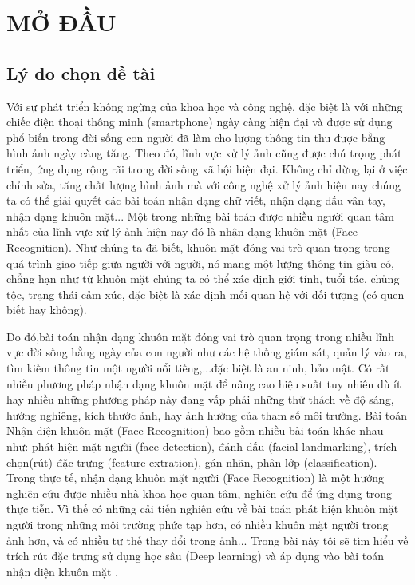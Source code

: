 

\chapter*{MỞ ĐẦU}
\label{part:dimred}

\section{Lý do chọn đề tài}

Với sự phát triển không ngừng của khoa học và công nghệ, đặc biệt là với những
chiếc điện thoại thông minh (smartphone) ngày càng hiện đại và được sử dụng
phổ biến trong đời sống con người đã làm cho lượng thông tin thu được bằng hình ảnh
ngày càng tăng. Theo đó, lĩnh vực xử lý ảnh cũng được chú trọng phát triển, ứng dụng
rộng rãi trong đời sống xã hội hiện đại. Không chỉ dừng lại ở việc chỉnh sửa, tăng
chất lượng hình ảnh mà với công nghệ xử lý ảnh hiện nay chúng ta có thể giải quyết
các bài toán nhận dạng chữ viết, nhận dạng dấu vân tay, nhận dạng khuôn mặt...
Một trong những bài toán được nhiều người quan tâm nhất của lĩnh vực xử lý ảnh hiện nay
đó là nhận dạng khuôn mặt (Face Recognition). Như chúng ta đã biết, khuôn mặt đóng
vai trò quan trọng trong quá trình giao tiếp giữa người với người, nó mang một lượng
thông tin giàu có, chẳng hạn như từ khuôn mặt chúng ta có thể xác định giới tính, tuổi tác,
chủng tộc, trạng thái cảm xúc, đặc biệt là xác định mối quan hệ với đối tượng (có quen biết
hay không).


Do đó,bài toán nhận dạng khuôn mặt đóng vai trò quan trọng trong nhiều lĩnh vực
đời sống hằng ngày của con người như các hệ thống giám sát, quản lý vào
ra, tìm kiếm thông tin một người nổi tiếng,...đặc biệt là an ninh, bảo mật.
Có rất nhiều phương pháp nhận dạng khuôn mặt để nâng cao hiệu suất tuy nhiên dù ít hay
nhiều những phương pháp này đang vấp phải những thử thách về độ sáng, hướng nghiêng,
kích thước ảnh, hay ảnh hưởng của tham số môi trường. Bài toán
Nhận diện khuôn mặt (Face Recognition) bao gồm nhiều bài toán khác nhau như:
phát hiện mặt người (face detection), đánh dấu (facial landmarking), trích chọn(rút) đặc trưng
(feature extration), gán nhãn, phân lớp (classification).
Trong thực tế, nhận dạng khuôn mặt người (Face Recognition) là một hướng nghiên cứu được
nhiều nhà khoa học quan tâm, nghiên cứu để ứng dụng trong thực tiễn.
Vì thế có những cải tiến nghiên cứu về bài toán phát hiện khuôn mặt người trong
những môi trường phức tạp hơn, có nhiều khuôn mặt người trong ảnh hơn,
và có nhiều tư thế thay đổi trong ảnh... Trong bài này tôi sẽ tìm hiểu về trích rút đặc
trưng sử dụng học sâu (Deep learning) và áp dụng vào bài toán nhận diện khuôn mặt .

